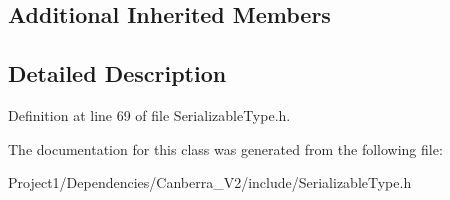 \subsection*{Additional Inherited Members}


\subsection{Detailed Description}


Definition at line 69 of file Serializable\+Type.\+h.



The documentation for this class was generated from the following file\+:\begin{DoxyCompactItemize}
\item 
Project1/\+Dependencies/\+Canberra\+\_\+\+V2/include/Serializable\+Type.\+h\end{DoxyCompactItemize}
